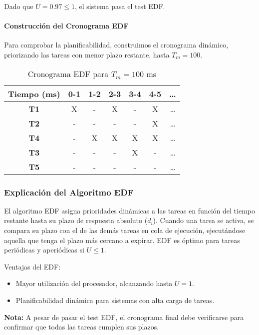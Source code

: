 \documentclass[a4paper,12pt]{article}
\begin{document}
Dado que \(U = 0.97 \leq 1\), el sistema pasa el test EDF.

\paragraph{Construcción del Cronograma EDF}
Para comprobar la planificabilidad, construimos el cronograma dinámico, priorizando las tareas con menor plazo restante, hasta \(T_m = 100\).

\begin{table}[H]
\centering
\begin{tabular}{|c|c|c|c|c|c|c|}
\hline
\textbf{Tiempo (ms)} & 0-1 & 1-2 & 2-3 & 3-4 & 4-5 & \ldots \\ \hline
\textbf{T1} & X & - & X & - & X & \ldots \\ \hline
\textbf{T2} & - & - & - & - & X & \ldots \\ \hline
\textbf{T4} & - & X & X & X & X & \ldots \\ \hline
\textbf{T3} & - & - & - & X & - & \ldots \\ \hline
\textbf{T5} & - & - & - & - & - & \ldots \\ \hline
\end{tabular}
\caption{Cronograma EDF para \(T_m = 100\) ms}
\end{table}



\subsubsection{Explicación del Algoritmo EDF}
El algoritmo EDF asigna prioridades dinámicas a las tareas en función del tiempo restante hasta su plazo de respuesta absoluto (\(d_i\)). Cuando una tarea se activa, se compara su plazo con el de las demás tareas en cola de ejecución, ejecutándose aquella que tenga el plazo más cercano a expirar. EDF es óptimo para tareas periódicas y aperiódicas si \(U \leq 1\).

Ventajas del EDF:
\begin{itemize}
    \item Mayor utilización del procesador, alcanzando hasta \(U = 1\).
    \item Planificabilidad dinámica para sistemas con alta carga de tareas.
\end{itemize}

\textbf{Nota:} A pesar de pasar el test EDF, el cronograma final debe verificarse para confirmar que todas las tareas cumplen sus plazos.
\end{document}
